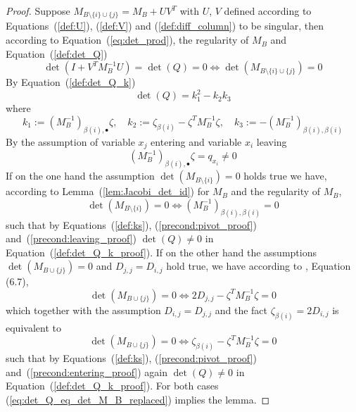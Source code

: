 \documentclass[a4paper]{article}
\begin{document}
\begin{proof}
Suppose $M_{B \setminus \{i\} \cup \{j\}}=M_{B}+UV^{T}$ with
$U$, $V$ defined according to Equations~(\ref{def:U}), (\ref{def:V})
and (\ref{def:diff_column}) to be singular, then according to
Equation~(\ref{eq:det_prod}), the regularity of $M_{B}$ and
Equation~(\ref{def:det_Q})
\begin{equation}
\label{eq:det_Q_eq_det_M_B_replaced}
\det \left(I+V^{T}M_{B}^{-1}U\right) =
\det(Q) = 0
\Longleftrightarrow
\det(M_{B \setminus \{i\} \cup \{j\}})=0
\end{equation}
By Equation~(\ref{def:det_Q_k})
\begin{equation}
\label{def:det_Q_k_proof}
\det(Q) = k_{1}^{2} - k_{2}k_{3}
\end{equation}
where
\begin{equation}
\label{def:ks}
k_{1}:=\left(M_{B}^{-1}\right)_{\beta(i), \bullet}\zeta,
\quad
k_{2}:=\zeta_{\beta(i)} - \zeta^{T}M_{B}^{-1}\zeta,
\quad
k_{3}:=-\left(M_{B}^{-1}\right)_{\beta(i), \beta(i)}
\end{equation}
By the assumption of variable $x_{j}$ entering and variable $x_{i}$ leaving
\begin{equation}
\label{precond:pivot_proof}
\left(M_{B}^{-1}\right)_{\beta(i), \bullet}
\zeta
=
q_{x_{i}}
\neq
0
\end{equation}
If on the one hand the assumption $\det(M_{B\setminus \{i\}})=0$ holds true
we have, according to Lemma~(\ref{lem:Jacobi_det_id}) for $M_{B}$ and
the regularity of $M_{B}$, 
\begin{equation}
\label{precond:leaving_proof}
\det(M_{B \setminus \{i\}})=0
\Longleftrightarrow
\left(M_{B}^{-1}\right)_{\beta(i),\beta(i)}=0
\end{equation}
such that by Equations~(\ref{def:ks}), (\ref{precond:pivot_proof})
and~(\ref{precond:leaving_proof}) $\det(Q) \neq 0$ in
Equation~(\ref{def:det_Q_k_proof}).
If on the other hand the assumptions $\det(M_{B \cup \{j\}})=0$ and
$D_{j,j}=D_{i,j}$ hold true, we have according to \cite{Sven},
Equation (6.7),
\begin{equation*}
\det(M_{B \cup \{j\}}) = 0
\Longleftrightarrow
2D_{j,j} -\zeta^{T}M_{B}^{-1}\zeta = 0
\end{equation*}
which together with the assumption $D_{i,j}=D_{j,j}$ and
the fact $\zeta_{\beta(i)}=2D_{i,j}$ is equivalent to
\begin{equation}
\label{precond:entering_proof}
\det(M_{B \cup \{j\}}) = 0
\Longleftrightarrow
\zeta_{\beta(i)} -\zeta^{T}M_{B}^{-1}\zeta = 0
\end{equation}
such that by Equations~(\ref{def:ks}), (\ref{precond:pivot_proof})
and~(\ref{precond:entering_proof}) again $\det(Q) \neq 0$
in Equation~(\ref{def:det_Q_k_proof}).
For both cases (\ref{eq:det_Q_eq_det_M_B_replaced}) implies the lemma.
\end{proof}
\end{document}
